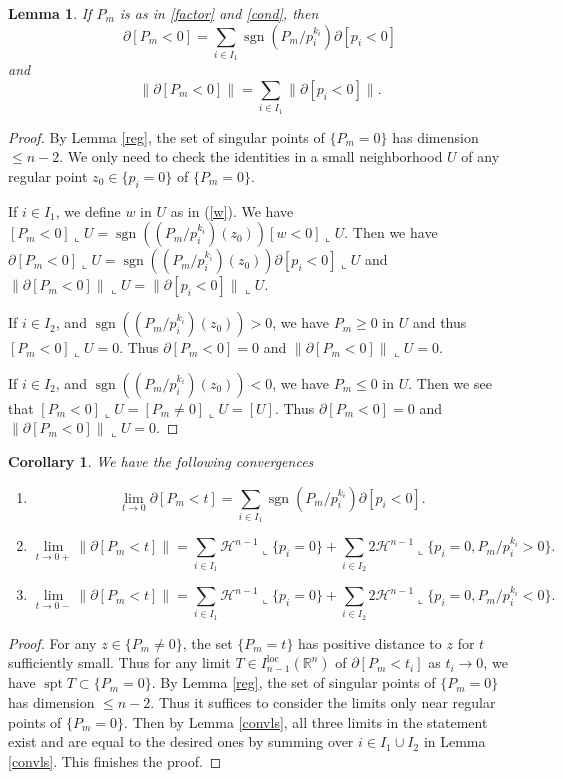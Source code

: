 \documentclass[pdflatex,sn-mathphys-num]{sn-jnl}%
\theoremstyle{thmstyleone}%
\newtheorem{lemma}[theorem]{Lemma}
\newtheorem{corollary}[theorem]{Corollary}
\theoremstyle{thmstyletwo}%
\theoremstyle{thmstylethree}%
\newcommand{\HH}{\mathcal{H}}
\newcommand{\R}{\mathbb{R}}
\newcommand{\loc}{\mathrm{loc}}
\DeclareMathOperator{\sgn}{sgn}
\DeclareMathOperator{\spt}{spt}
\begin{document}
\begin{lemma}\label{partial[P_m<0]and|partial[P_m<0]|}
If $P_m$ is as in \eqref{factor} and \eqref{cond}, then
    \[\partial[P_m<0]=\sum_{i\in I_1}\sgn \left(P_m/p_i^{k_i}\right)\partial [p_i<0]\]
    and
    \[\|\partial[P_m<0]\|=\sum_{i\in I_1}\|\partial [p_i<0]\|.\]
\end{lemma}
\begin{proof}
    By Lemma \ref{reg}, the set of singular points of $\{P_m=0\}$ has dimension $\le n-2$. We only need to check the identities in a small neighborhood $U$ of any regular point $z_0\in \{p_i=0\}$ of $\{P_m=0\}$.
	
	If $i\in I_1$, we define $w$ in $U$ as in (\ref{w}). We have $[P_m<0]\llcorner U=\sgn ((P_m/p_i^{k_i})(z_0)) [w<0]\llcorner U$. Then we have $\partial [P_m<0]\llcorner U=\sgn ((P_m/p_i^{k_i})(z_0))\partial [p_i<0]\llcorner U$ and $\|\partial [P_m<0]\|\llcorner U=\|\partial [p_i<0]\|\llcorner U$.
	
	If $i\in I_2$, and $\sgn ((P_m/p_i^{k_i})(z_0))>0$, we have $P_m\ge0$ in $U$ and thus $[P_m<0]\llcorner U=0$. Thus $\partial [P_m<0]=0$ and $\|\partial [P_m<0]\|\llcorner U=0$.
	
	If $i\in I_2$, and $\sgn ((P_m/p_i^{k_i})(z_0))<0$, we have $P_m\le0$ in $U$. Then we see that $[P_m<0]\llcorner U=[P_m\neq0]\llcorner U=[U]$. Thus $\partial [P_m<0]=0$ and $\|\partial [P_m<0]\|\llcorner U=0$.
\end{proof}
\begin{corollary}\label{convlscor}We have the following convergences
	\begin{enumerate}
		\item[(i)]
		\[
		\lim_{t\to 0}\partial[P_m<t] =\sum_{i\in I_1}\sgn \left(P_m/p_i^{k_i}\right)\partial [p_i<0].
		\]
		\item[(ii)]
		\[\lim_{t\to 0+}\|\partial[P_m<t]\|= \sum_{i\in I_1}\HH^{n-1}\llcorner{\{p_i=0\}}+\sum_{i\in I_2}2\HH^{n-1}\llcorner{\{p_i=0,P_m/p_i^{k_i}>0\}}.\]
		\item[(iii)]
		\[\lim_{t\to 0-}\|\partial[P_m<t]\|= \sum_{i\in I_1}\HH^{n-1}\llcorner{\{p_i=0\}}+\sum_{i\in I_2}2\HH^{n-1}\llcorner{\{p_i=0,P_m/p_i^{k_i}<0\}}.\]
	\end{enumerate}
\end{corollary}
\begin{proof}
	For any $z\in\{P_m\neq0\}$, the set $\{P_m=t\}$ has positive distance to $z$ for $t$ sufficiently small. Thus for any limit $T\in I_{n-1}^\loc(\R^{n})$ of $\partial [P_m<t_i]$ as $t_i\to0$, we have $\spt T\subset \{P_m=0\}$. By Lemma \ref{reg}, the set of singular points of $\{P_m=0\}$ has dimension $\le n-2$. Thus it suffices to consider the limits only near regular points of $\{P_m=0\}$. Then by Lemma \ref{convls}, all three limits in the statement exist and are equal to the desired ones by summing over $i\in I_1\cup I_2$ in Lemma \ref{convls}. This finishes the proof.
\end{proof}
\end{document}
